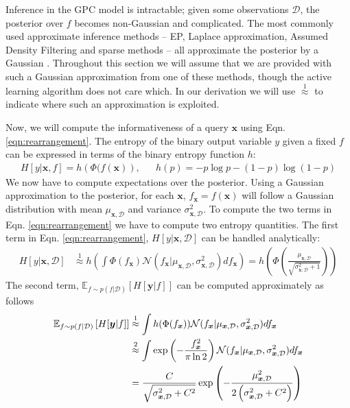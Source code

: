 \documentclass{article}
\newcommand{\x}{\bm{x}}
\newcommand{\y}{\bm{y}}
\newcommand{\data}{\mathcal{D}}
\newcommand{\E}{\mathbb{E}}
\begin{document}
Inference in the GPC model is intractable; given some observations $\data$, the posterior over $f$ becomes non-Gaussian and complicated. The most commonly used approximate inference methods -- EP,  Laplace approximation, Assumed Density Filtering and sparse methods -- all approximate the posterior by a Gaussian \cite{rasmussen2005}. Throughout this section we will assume that we are provided with such a Gaussian approximation from one of these methods, though the active learning algorithm does not care which. In our derivation we will use {\scriptsize$\stackrel{1}{\approx}$} to indicate where such an approximation is exploited.

Now, we will compute the informativeness of a query $\x$ using Eqn.  \eqref{eqn:rearrangement}.  The entropy of the binary output variable $y$ given a fixed $f$ can be expressed in terms of the binary entropy function $h$: 
\begin{align}
H[y\vert\x,f] = h\left(\Phi(f(\x)\right), && h(p)=- p\log p - (1-p)\log(1-p)
\end{align}
We now have to compute expectations over the posterior. Using a Gaussian approximation to the posterior, for each $\x$, $f_{\x} = f(\x)$ will follow a Gaussian distribution with mean $\mu_{\x,\data}$ and variance $\sigma_{\x,\data}^2$. To compute the two terms in Eqn. \eqref{eqn:rearrangement} we have to compute two entropy quantities. The first term in Eqn. \eqref{eqn:rearrangement}, $H[y\vert\x,\data]$ can be handled analytically:
\begin{align}
	H[y\vert\x,\data] &\stackrel{1}{\approx} h\left( \int \Phi( f_{\x} )  \mathcal{N}(f_{\x}\vert \mu_{\x,\data},\sigma_{\x,\data}^2) df_{\x} \right)  = h \left( \Phi\left( \frac{\mu_{\x,\data}}{\sqrt{\sigma^2_{\x,\data} + 1}} \right)\right)\label{ent_mean}
\end{align}
The second term, $\E_{f \sim p(f\vert\data)} \left[ H[\y\vert f] \right]$ can be computed approximately as follows
\begin{align}
	\E_{f \sim p(f\vert\data)} \left[ H[\y\vert f] \right] &\stackrel{1}{\approx}\int h(\Phi(f_{\x})) \mathcal{N}(f_{\x}\vert \mu_{\x,\data},\sigma_{\x,\data}^2)df_{\x}\label{eqn:mean_entropy}\\
	&\stackrel{2}{\approx} \int \exp\left(-\frac{f_{\x}^2}{\pi\ln2}\right) \mathcal{N}(f_{\x}\vert \mu_{\x,\data},\sigma_{\x,\data}^2)df_{\x}\notag\\	
	&= \frac{C}{\sqrt{\sigma_{\x,\data}^2 + C^2}}\exp\left(-\frac{\mu_{\x,\data}^2}{2\left(\sigma_{\x,\data}^2 + C^2\right)}\right)\notag
\end{align}
\end{document}

